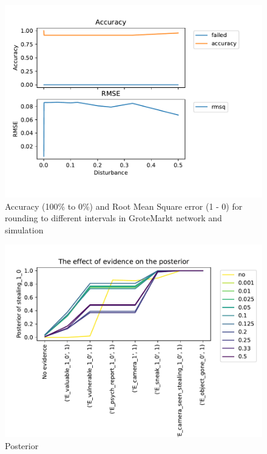 \begin{figure}[htbp]
\begin{center}
\includegraphics[width=\linewidth]{../experiments/GroteMarkt/plots/performance_GroteMarkt.pdf}
\caption{Accuracy (100\% to 0\%) and Root Mean Square error (1 - 0) for rounding to different intervals in GroteMarkt network and simulation}
\label{groteMarktperfo}
\end{center}
\end{figure}

\begin{figure}[htbp]
\begin{center}
\includegraphics[width=\linewidth]{../experiments/GroteMarkt/plots/posterior_GroteMarkt.pdf}
\caption{Posterior}
\label{groteMarktp}
\end{center}
\end{figure}

